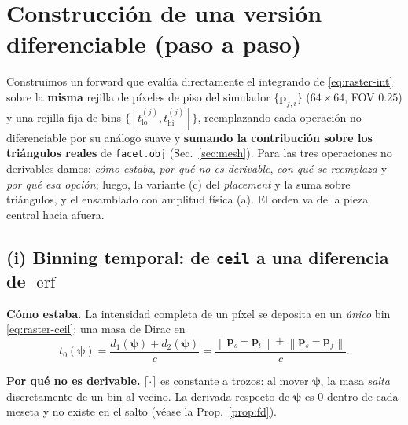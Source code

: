 \documentclass[11pt,a4paper]{article}
\theoremstyle{plain}
\theoremstyle{definition}
\newcommand{\vect}[1]{\boldsymbol{#1}}
\newcommand{\erf}{\operatorname{erf}}
\newcommand{\norm}[1]{\left\lVert #1 \right\rVert}
\begin{document}
\section{Construcci\'on de una versi\'on diferenciable (paso a paso)}
\label{sec:construccion}

Construimos un forward que eval\'ua directamente el integrando de
\eqref{eq:raster-int} sobre la \textbf{misma} rejilla de p\'ixeles de piso del
simulador $\{\vect{p}_{f,i}\}$ ($64\times64$, FOV $0.25$) y una rejilla fija de
bins $\{[t^{(j)}_{\mathrm{lo}},t^{(j)}_{\mathrm{hi}}]\}$, reemplazando cada
operaci\'on no diferenciable por su an\'alogo suave y \textbf{sumando la
contribuci\'on sobre los tri\'angulos reales} de \texttt{facet.obj}
(Sec.~\ref{sec:mesh}). Para las tres operaciones no derivables damos: \emph{c\'omo
estaba}, \emph{por qu\'e no es derivable}, \emph{con qu\'e se reemplaza} y
\emph{por qu\'e esa opci\'on}; luego, la variante (c) del \emph{placement} y la
suma sobre tri\'angulos, y el ensamblado con amplitud f\'isica (a). El orden va de
la pieza central hacia afuera.

\subsection{(i) Binning temporal: de \texttt{ceil} a una diferencia de \texorpdfstring{$\erf$}{erf}}
\label{sec:erf}

\textbf{C\'omo estaba.} La intensidad completa de un p\'ixel se deposita en un
\emph{\'unico} bin \eqref{eq:raster-ceil}: una masa de Dirac en
\begin{equation}
    t_0(\vect{\psi})=\frac{d_1(\vect\psi)+d_2(\vect\psi)}{c}
    =\frac{\norm{\vect{p}_s-\vect{p}_l}+\norm{\vect{p}_s-\vect{p}_f}}{c}.
    \label{eq:tof}
\end{equation}

\textbf{Por qu\'e no es derivable.} $\lceil\cdot\rceil$ es constante a trozos:
al mover $\vect{\psi}$, la masa \emph{salta} discretamente de un bin al vecino.
La derivada respecto de $\vect{\psi}$ es $0$ dentro de cada meseta y no existe en
el salto (v\'ease la Prop.~\ref{prop:fd}).
\end{document}
